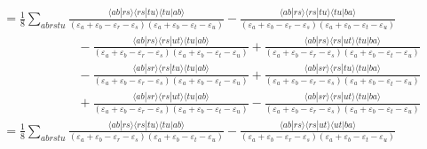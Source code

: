\documentclass[a4paper]{book}
\newcounter{solution}[chapter]
\begin{document}
\begin{solution}
\begin{align*}
		&= \frac{1}{8} \sum_{abrstu} \frac{ \langle ab | rs \rangle \langle rs | tu \rangle \langle tu | ab \rangle }{ ( \varepsilon_a + \varepsilon_b - \varepsilon_r - \varepsilon_s ) ( \varepsilon_a + \varepsilon_b - \varepsilon_t - \varepsilon_u ) } - \frac{ \langle ab | rs \rangle \langle rs | tu \rangle \langle tu | ba \rangle }{ ( \varepsilon_a + \varepsilon_b - \varepsilon_r - \varepsilon_s ) ( \varepsilon_a + \varepsilon_b - \varepsilon_t - \varepsilon_u ) } \\
		&\hspace{6em} - \frac{ \langle ab | rs \rangle \langle rs | ut \rangle \langle tu | ab \rangle }{ ( \varepsilon_a + \varepsilon_b - \varepsilon_r - \varepsilon_s ) ( \varepsilon_a + \varepsilon_b - \varepsilon_t - \varepsilon_u ) } + \frac{ \langle ab | rs \rangle \langle rs | ut \rangle \langle tu | ba \rangle }{ ( \varepsilon_a + \varepsilon_b - \varepsilon_r - \varepsilon_s ) ( \varepsilon_a + \varepsilon_b - \varepsilon_t - \varepsilon_u ) } \\
		&\hspace{6em} - \frac{ \langle ab | sr \rangle \langle rs | tu \rangle \langle tu | ab \rangle }{ ( \varepsilon_a + \varepsilon_b - \varepsilon_r - \varepsilon_s ) ( \varepsilon_a + \varepsilon_b - \varepsilon_t - \varepsilon_u ) } + \frac{ \langle ab | sr \rangle \langle rs | tu \rangle \langle tu | ba \rangle }{ ( \varepsilon_a + \varepsilon_b - \varepsilon_r - \varepsilon_s ) ( \varepsilon_a + \varepsilon_b - \varepsilon_t - \varepsilon_u ) } \\
		&\hspace{6em} + \frac{ \langle ab | sr \rangle \langle rs | ut \rangle \langle tu | ab \rangle }{ ( \varepsilon_a + \varepsilon_b - \varepsilon_r - \varepsilon_s ) ( \varepsilon_a + \varepsilon_b - \varepsilon_t - \varepsilon_u ) } - \frac{ \langle ab | sr \rangle \langle rs | ut \rangle \langle tu | ba \rangle }{ ( \varepsilon_a + \varepsilon_b - \varepsilon_r - \varepsilon_s ) ( \varepsilon_a + \varepsilon_b - \varepsilon_t - \varepsilon_u ) } \\
		&= \frac{1}{8} \sum_{abrstu} \frac{ \langle ab | rs \rangle \langle rs | tu \rangle \langle tu | ab \rangle }{ ( \varepsilon_a + \varepsilon_b - \varepsilon_r - \varepsilon_s ) ( \varepsilon_a + \varepsilon_b - \varepsilon_t - \varepsilon_u ) } - \frac{ \langle ab | rs \rangle \langle rs | ut \rangle \langle ut | ba \rangle }{ ( \varepsilon_a + \varepsilon_b - \varepsilon_r - \varepsilon_s ) ( \varepsilon_a + \varepsilon_b - \varepsilon_t - \varepsilon_u ) } \\

\end{align*}
\end{solution}
\end{document}
